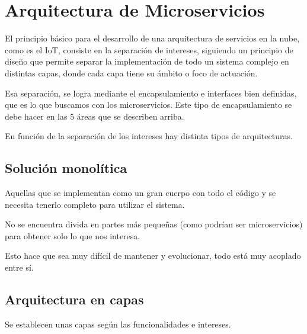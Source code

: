 \documentclass[12pt]{report} %
\begin{document}
\section{Arquitectura de Microservicios}

El principio básico para el desarrollo de una arquitectura de servicios en la nube, como es el IoT, consiste en la separación de intereses, siguiendo un principio de diseño que permite separar la implementación de todo un sistema complejo en distintas capas, donde cada capa tiene su ámbito o foco de actuación. 

Esa separación, se logra mediante el encapsulamiento e interfaces bien definidas, que es lo que buscamos con los microservicios.
Este tipo de encapsulamiento se debe hacer en las 5 áreas que se describen arriba.

En función de la separación de los intereses hay distinta tipos de arquitecturas.

\subsection{Solución monolítica} 
Aquellas que se implementan como un gran cuerpo con todo el código y se necesita tenerlo completo para utilizar el sistema.

No se encuentra divida en partes más pequeñas (como podrían ser microservicios) para obtener solo lo que nos interesa. 

Esto hace que sea muy difícil de mantener y evolucionar, todo está muy acoplado entre sí.

\subsection{Arquitectura en capas}
Se establecen unas capas según las funcionalidades e intereses.
\end{document}
